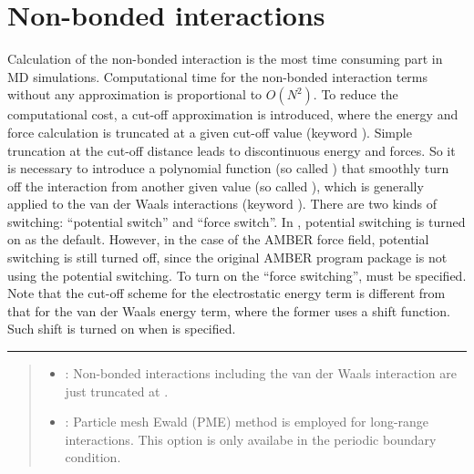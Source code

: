 \documentclass[a4paper,11pt,oneside,english]{sphinxmanual}
\begin{document}
\section{Non-bonded interactions}
\label{\detokenize{05_Energy:non-bonded-interactions}}
Calculation of the non-bonded interaction is the most time consuming part in MD simulations.
Computational time for the non-bonded interaction terms without
any approximation is proportional to \(O(N^2)\).
To reduce the computational cost, a cut-off approximation is introduced,
where the energy and force calculation is truncated at a given cut-off value (keyword ).
Simple truncation at the cut-off distance leads to discontinuous
energy and forces. So it is necessary to introduce a polynomial function
(so called ) that smoothly turn off the interaction from
another given value (so called ), which is generally applied
to the van der Waals interactions (keyword ).
There are two kinds of switching: “potential switch” and “force switch”.
In , potential switching is turned on as the default.
However, in the case of the AMBER force field, potential switching is still turned off,
since the original AMBER program package is not using the potential switching.
To turn on the “force switching”,  must be specified.
Note that the cut-off scheme for the electrostatic energy term is different from
that for the van der Waals energy term, where the former uses a shift function.
Such shift is turned on when  is specified.


\bigskip\hrule\bigskip


 
\begin{quote}

\begin{itemize}
\item {} 
: Non-bonded interactions including the van der Waals interaction are just truncated at .

\item {} 
: Particle mesh Ewald (PME) method is employed for long-range interactions. This option is only availabe in the periodic boundary condition.

\end{itemize}
\end{quote}
\end{document}
